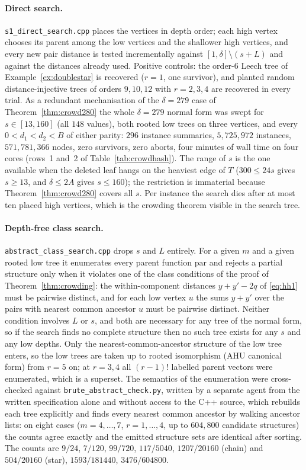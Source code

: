 \documentclass[11pt,a4paper]{article}
\theoremstyle{plain}
\theoremstyle{remark}
\newcommand{\file}[1]{\texttt{#1}}
\begin{document}
\paragraph{Direct search.}
\file{s1\_direct\_search.cpp} places the vertices in depth order; each high
vertex chooses its parent among the low vertices and the shallower high
vertices, and every new pair distance is tested incrementally against
$[1,\delta]\setminus(s+L)$ and against the distances already used.  Positive
controls: the order-$6$ Leech tree of Example~\ref{ex:doublestar} is recovered
($r=1$, one survivor), and planted random distance-injective trees of orders
$9,10,12$ with $r=2,3,4$ are recovered in every trial.  As a redundant
mechanisation of the $\delta=279$ case of Theorem~\ref{thm:crowd280} the whole
$\delta=279$ normal form was swept for $s\in[13,160]$ (all $148$ values), both
rooted low trees on three vertices, and every $0<d_1<d_2<B$ of either parity:
$296$ instance summaries, $5{,}725{,}972$ instances, $571{,}781{,}366$ nodes,
zero survivors, zero aborts, four minutes of wall time on four cores
(rows~1 and~2 of Table~\ref{tab:crowdhash}).
The range of $s$ is the one available when the deleted leaf hangs on the
heaviest edge of $T$ ($300\le 24s$ gives $s\ge13$, and $\delta\le2A$ gives
$s\le160$); the restriction is immaterial because
Theorem~\ref{thm:crowd280} covers all $s$.  Per instance the search dies after
at most ten placed high vertices, which is the crowding theorem visible in the
search tree.

\paragraph{Depth-free class search.}
\file{abstract\_class\_search.cpp} drops $s$ and $L$ entirely.  For a given $m$
and a given rooted low tree it enumerates every parent function
$\mathrm{par}$ and rejects a partial structure only when it violates one of the
class conditions of the proof of Theorem~\ref{thm:crowding}: the within-component
distances $y+y'-2q$ of \eqref{eq:hh1} must be pairwise distinct, and for each
low vertex $u$ the sums $y+y'$ over the pairs with nearest common ancestor $u$
must be pairwise distinct.  Neither condition involves $L$ or $s$, and both are
necessary for any tree of the normal form, so if the search finds no complete
structure then no such tree exists for any $s$ and any low depths.  Only the
nearest-common-ancestor structure of the low tree enters, so the low trees are
taken up to rooted isomorphism (AHU canonical form) from $r=5$ on; at $r=3,4$
all $(r-1)!$ labelled parent vectors were enumerated, which is a superset.  The
semantics of the enumeration were cross-checked against
\file{brute\_abstract\_check.py}, written by a separate agent from the written
specification alone and without access to the C++ source, which rebuilds each
tree explicitly and finds every nearest common ancestor by walking ancestor
lists: on eight cases ($m=4,\dots,7$, $r=1,\dots,4$, up to $604{,}800$ candidate
structures) the counts agree exactly and the emitted structure sets are
identical after sorting.  The counts are
$9/24$, $7/120$, $99/720$, $117/5040$, $1207/20160$ (chain) and $504/20160$
(star), $1593/181440$, $3476/604800$.
\end{document}
